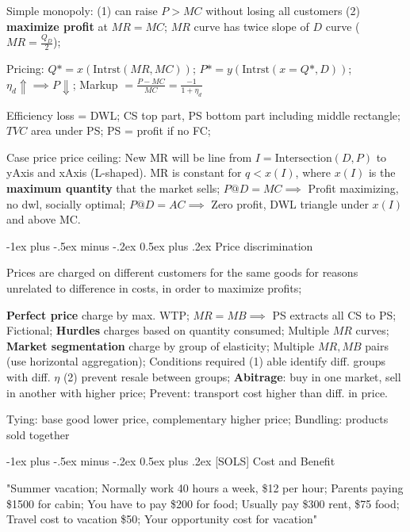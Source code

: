 \documentclass[a4paper]{article}
\makeatletter
\renewcommand{\section}{\@startsection{section}{1}{0mm}%
                                {-1ex plus -.5ex minus -.2ex}%
                                {0.5ex plus .2ex}%
                                {\normalfont\small\bfseries}}
\makeatother
\begin{document}
\begin{multicols*}{3}
        Simple monopoly: (1) can raise $P > MC$ without losing all customers (2) \textbf{maximize profit} at $MR=MC$; $MR$ curve has twice slope of $D$ curve ($MR = \frac{Q_D}{2}$);

        Pricing: $Q* = x(\text{Intrst}(MR,MC))$; $P* = y(\text{Intrst}(x=Q*, D))$; $\eta_d \Uparrow \implies P \Downarrow$; Markup $=\frac{P-MC}{MC} = \frac{-1}{1+\eta_d}$

        Efficiency loss = DWL; CS top part, PS bottom part including middle rectangle; $TVC$ area under PS; PS = profit if no FC;

        Case price price ceiling: New MR will be line from $I = \text{Intersection}(D, P)$ to yAxis and xAxis (L-shaped). MR is constant for $q < x(I)$, where $x(I)$ is the \textbf{maximum quantity} that the market sells; $P @ D=MC \implies$ Profit maximizing, no dwl, socially optimal; $P @ D=AC \implies$ Zero profit, DWL triangle under $x(I)$ and above MC.

        \section{Price discrimination}

        Prices are charged on different customers for the same goods for reasons unrelated to difference in costs, in order to maximize profits;

        \textbf{Perfect price} charge by max. WTP; $MR=MB \implies$ PS extracts all CS to PS; Fictional; \textbf{Hurdles} charges based on quantity consumed; Multiple $MR$ curves; \textbf{Market segmentation} charge by group of elasticity; Multiple $MR,MB$ pairs (use horizontal aggregation); Conditions required (1) able identify diff. groups with diff. $\eta$ (2) prevent resale between groups; \textbf{Abitrage}: buy in one market, sell in another with higher price; Prevent: transport cost higher than diff. in price.

    Tying: base good lower price, complementary higher price; Bundling: products sold together


    \section{[SOLS] Cost and Benefit}

    "Summer vacation; Normally work 40 hours a week, \$12 per hour; Parents paying \$1500 for cabin; You have to pay \$200 for food; Usually pay \$300 rent, \$75 food; Travel cost to vacation \$50; Your opportunity cost for vacation"


\end{multicols*}
\end{document}
